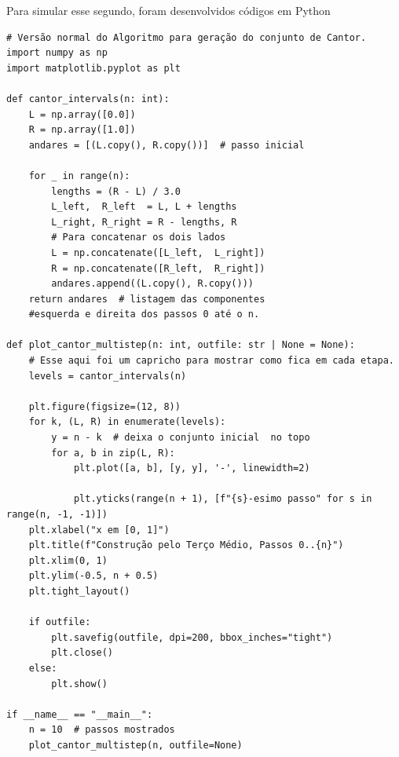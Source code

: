 \documentclass[12pt]{article}
\theoremstyle{definition}
\begin{document}
Para simular esse segundo, foram desenvolvidos códigos em Python
\begin{verbatim}
# Versão normal do Algoritmo para geração do conjunto de Cantor.
import numpy as np
import matplotlib.pyplot as plt

def cantor_intervals(n: int):
    L = np.array([0.0])
    R = np.array([1.0])
    andares = [(L.copy(), R.copy())]  # passo inicial

    for _ in range(n):
        lengths = (R - L) / 3.0
        L_left,  R_left  = L, L + lengths
        L_right, R_right = R - lengths, R
        # Para concatenar os dois lados
        L = np.concatenate([L_left,  L_right])
        R = np.concatenate([R_left,  R_right])
        andares.append((L.copy(), R.copy()))
    return andares  # listagem das componentes
    #esquerda e direita dos passos 0 até o n.

def plot_cantor_multistep(n: int, outfile: str | None = None):
    # Esse aqui foi um capricho para mostrar como fica em cada etapa.
    levels = cantor_intervals(n)

    plt.figure(figsize=(12, 8))
    for k, (L, R) in enumerate(levels):
        y = n - k  # deixa o conjunto inicial  no topo
        for a, b in zip(L, R):
            plt.plot([a, b], [y, y], '-', linewidth=2)

            plt.yticks(range(n + 1), [f"{s}-esimo passo" for s in range(n, -1, -1)])
    plt.xlabel("x em [0, 1]")
    plt.title(f"Construção pelo Terço Médio, Passos 0..{n}")
    plt.xlim(0, 1)
    plt.ylim(-0.5, n + 0.5)
    plt.tight_layout()

    if outfile:
        plt.savefig(outfile, dpi=200, bbox_inches="tight")
        plt.close()
    else:
        plt.show()

if __name__ == "__main__":
    n = 10  # passos mostrados
    plot_cantor_multistep(n, outfile=None)
\end{verbatim}
\end{document}
